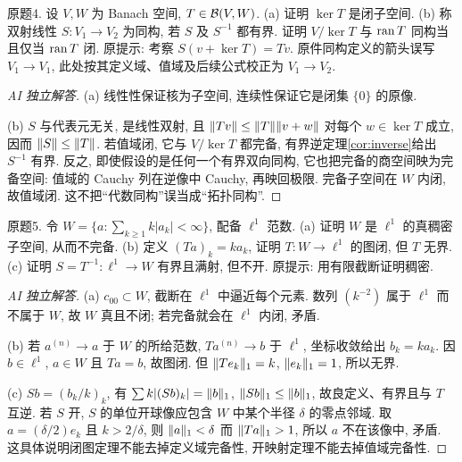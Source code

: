 \begin{exercise}\label{ps02:4}
原题4. 设 $V,W$ 为 Banach 空间, $T\in\mathcal B(V,W)$. (a) 证明 $\ker T$ 是闭子空间. (b) 称双射线性 $S:V_1\to V_2$ 为同构, 若 $S$ 及 $S^{-1}$ 都有界. 证明 $V/\ker T$ 与 $\operatorname{ran} T$ 同构当且仅当 $\operatorname{ran} T$ 闭. 原提示: 考察 $S(v+\ker T)=Tv$. 原件同构定义的箭头误写 $V_1\to V_1$, 此处按其定义域、值域及后续公式校正为 $V_1\to V_2$.
\end{exercise}
\begin{proof}[AI 独立解答]
(a) 线性性保证核为子空间, 连续性保证它是闭集 $\{0\}$ 的原像.

(b) $S$ 与代表元无关, 是线性双射, 且 $\lVert Tv\rVert\le\lVert T\rVert\lVert v+w\rVert$ 对每个 $w\in\ker T$ 成立, 因而 $\lVert S\rVert\le\lVert T\rVert$. 若值域闭, 它与 $V/\ker T$ 都完备, 有界逆定理\ref{cor:inverse}给出 $S^{-1}$ 有界. 反之, 即使假设的是任何一个有界双向同构, 它也把完备的商空间映为完备空间: 值域的 Cauchy 列在逆像中 Cauchy, 再映回极限. 完备子空间在 $W$ 内闭, 故值域闭. 这不把“代数同构”误当成“拓扑同构”.
\end{proof}
\begin{exercise}\label{ps02:5}
原题5. 令 $W=\{a:\sum_{k\ge1}k|a_k|<\infty\}$, 配备 $\ell^1$ 范数. (a) 证明 $W$ 是 $\ell^1$ 的真稠密子空间, 从而不完备. (b) 定义 $(Ta)_k=ka_k$, 证明 $T:W\to\ell^1$ 的图闭, 但 $T$ 无界. (c) 证明 $S=T^{-1}:\ell^1\to W$ 有界且满射, 但不开. 原提示: 用有限截断证明稠密.
\end{exercise}
\begin{proof}[AI 独立解答]
(a) $c_{00}\subset W$, 截断在 $\ell^1$ 中逼近每个元素. 数列 $(k^{-2})$ 属于 $\ell^1$ 而不属于 $W$, 故 $W$ 真且不闭; 若完备就会在 $\ell^1$ 内闭, 矛盾.

(b) 若 $a^{(n)}\to a$ 于 $W$ 的所给范数, $Ta^{(n)}\to b$ 于 $\ell^1$, 坐标收敛给出 $b_k=ka_k$. 因 $b\in\ell^1$, $a\in W$ 且 $Ta=b$, 故图闭. 但 $\lVert Te_k\rVert_1=k$, $\lVert e_k\rVert_1=1$, 所以无界.

(c) $Sb=(b_k/k)_k$, 有 $\sum k|(Sb)_k|=\lVert b\rVert_1$, $\lVert Sb\rVert_1\le\lVert b\rVert_1$, 故良定义、有界且与 $T$ 互逆. 若 $S$ 开, $S$ 的单位开球像应包含 $W$ 中某个半径 $\delta$ 的零点邻域. 取 $a=(\delta/2)e_k$ 且 $k>2/\delta$, 则 $\lVert a\rVert_1<\delta$ 而 $\lVert Ta\rVert_1>1$, 所以 $a$ 不在该像中, 矛盾. 这具体说明闭图定理不能去掉定义域完备性, 开映射定理不能去掉值域完备性.
\end{proof}
